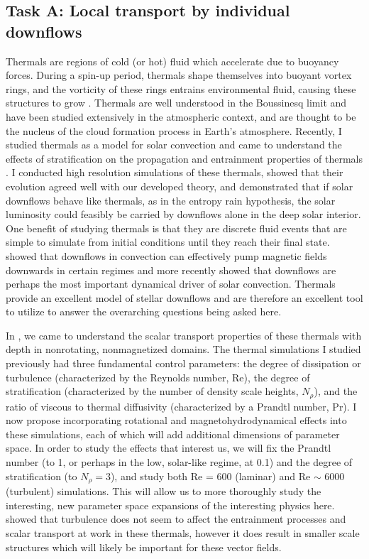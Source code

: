 \documentclass[aasms,12pt]{article}
\begin{document}
\subsection{Task A: Local transport by individual downflows}
Thermals are regions of cold (or hot) fluid which accelerate due to buoyancy forces.
During a spin-up period, thermals shape themselves into buoyant vortex rings, and the vorticity of these rings entrains environmental fluid, causing these structures to grow \citep{lecoanet&jeevanjee2019}.
Thermals are well understood in the Boussinesq limit and have been studied extensively in the atmospheric context, and are thought to be the nucleus of the cloud formation process in Earth's atmosphere.
Recently, I studied thermals as a model for solar convection and came to understand the effects of stratification on the propagation and entrainment properties of thermals \citep{andersLB2019}.
I conducted high resolution simulations of these thermals, showed that their evolution agreed well with our developed theory, and demonstrated that if solar downflows behave like thermals, as in the entropy rain hypothesis, the solar luminosity could feasibly be carried by downflows alone in the deep solar interior.
One benefit of studying thermals is that they are discrete fluid events that are simple to simulate from initial conditions until they reach their final state.
\citet{tobias&all1998} showed that downflows in convection can effectively pump magnetic fields downwards in certain regimes and more recently \citet{kapyla&all2017} showed that downflows are perhaps the most important dynamical driver of solar convection.
Thermals provide an excellent model of stellar downflows and are therefore an excellent tool to utilize to answer the overarching questions being asked here.


In \citet{andersLB2019}, we came to understand the scalar transport properties of these thermals with depth in nonrotating, nonmagnetized domains.
The thermal simulations I studied previously had three fundamental control parameters: the degree of dissipation or turbulence (characterized by the Reynolds number, Re), the degree of stratification (characterized by the number of density scale heights, $N_\rho$), and the ratio of viscous to thermal diffusivity (characterized by a Prandtl number, Pr).
I now propose incorporating rotational and magnetohydrodynamical effects into these simulations, each of which will add additional dimensions of parameter space.
In order to study the effects that interest us, we will fix the Prandtl number (to 1, or perhaps in the low, solar-like regime, at 0.1) and the degree of stratification (to $N_\rho = 3$), and study both Re = 600 (laminar) and Re $\sim$ 6000 (turbulent) simulations.
This will allow us to more thoroughly study the interesting, new parameter space expansions of the interesting physics here.
\citet{lecoanet&jeevanjee2019} showed that turbulence does not seem to affect the entrainment processes and scalar transport at work in these thermals, however it does result in smaller scale structures which will likely be important for these vector fields.
\end{document}
